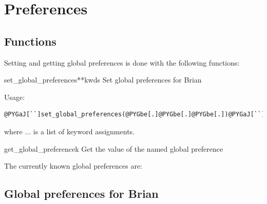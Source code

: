 \documentclass[letterpaper,10pt]{manual}
\begin{document}
\hypertarget{index-89}{}\section{Preferences}


\subsection{Functions}

Setting and getting global preferences is done with the following
functions:


\hypertarget{brian.set_global_preferences}{}\begin{funcdesc}{set\_global\_preferences}{**kwds}
Set global preferences for Brian

Usage:

\begin{Verbatim}[commandchars=@\[\]]
@PYGaJ[``]set_global_preferences(@PYGbe[.]@PYGbe[.]@PYGbe[.])@PYGaJ[``]
\end{Verbatim}

where ... is a list of keyword assignments.
\end{funcdesc}


\hypertarget{brian.get_global_preference}{}\begin{funcdesc}{get\_global\_preference}{k}
Get the value of the named global preference
\end{funcdesc}

The currently known global preferences are:


\subsection{Global preferences for Brian}
\end{document}
